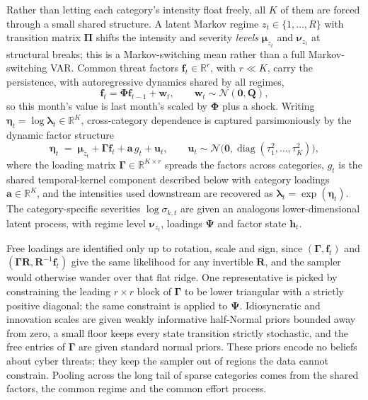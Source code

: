 \documentclass[review]{elsarticle}
\newcommand{\R}{\mathbb{R}}
\begin{document}
Rather than letting each category's intensity float freely, all $K$ of them are forced through a small shared structure. A latent Markov regime $z_t \in \{1, \dots, R\}$ with transition matrix $\bm{\Pi}$ shifts the intensity and severity \emph{levels} $\bm{\mu}_{z_t}$ and $\bm{\nu}_{z_t}$ at structural breaks; this is a Markov-switching mean rather than a full Markov-switching VAR. Common threat factors $\bm{f}_t \in \R^{r}$, with $r \ll K$, carry the persistence, with autoregressive dynamics shared by all regimes,
\begin{equation}\label{eq:factordyn}
    \bm{f}_t = \bm{\Phi} \bm{f}_{t-1} + \bm{w}_t,
    \qquad \bm{w}_t \sim \mathcal{N}(\bm{0}, \bm{Q}),
\end{equation}
so this month's value is last month's scaled by $\bm{\Phi}$ plus a shock. Writing $\bm{\eta}_t = \log \bm{\lambda}_t \in \R^{K}$, cross-category dependence is captured parsimoniously by the dynamic factor structure
\begin{equation}\label{eq:factor}
    \bm{\eta}_t \;=\; \bm{\mu}_{z_t} + \bm{\Gamma} \bm{f}_t + \bm{a}\, g_t + \bm{u}_t,
    \qquad
    \bm{u}_t \sim \mathcal{N}\big(\bm{0}, \operatorname{diag}(\tau_1^2, \dots, \tau_K^2)\big),
\end{equation}
where the loading matrix $\bm{\Gamma} \in \R^{K \times r}$ spreads the factors across categories, $g_t$ is the shared temporal-kernel component described below with category loadings $\bm{a} \in \R^{K}$, and the intensities used downstream are recovered as $\bm{\lambda}_t = \exp(\bm{\eta}_t)$. The category-specific severities $\log \sigma_{k,t}$ are given an analogous lower-dimensional latent process, with regime level $\bm{\nu}_{z_t}$, loadings $\bm{\Psi}$ and factor state $\bm{h}_t$.

Free loadings are identified only up to rotation, scale and sign, since $(\bm{\Gamma}, \bm{f}_t)$ and $(\bm{\Gamma}\bm{R}, \bm{R}^{-1}\bm{f}_t)$ give the same likelihood for any invertible $\bm{R}$, and the sampler would otherwise wander over that flat ridge. One representative is picked by constraining the leading $r \times r$ block of $\bm{\Gamma}$ to be lower triangular with a strictly positive diagonal; the same constraint is applied to $\bm{\Psi}$. Idiosyncratic and innovation scales are given weakly informative half-Normal priors bounded away from zero, a small floor keeps every state transition strictly stochastic, and the free entries of $\bm{\Gamma}$ are given standard normal priors. These priors encode no beliefs about cyber threats; they keep the sampler out of regions the data cannot constrain. Pooling across the long tail of sparse categories comes from the shared factors, the common regime and the common effort process.
\end{document}
